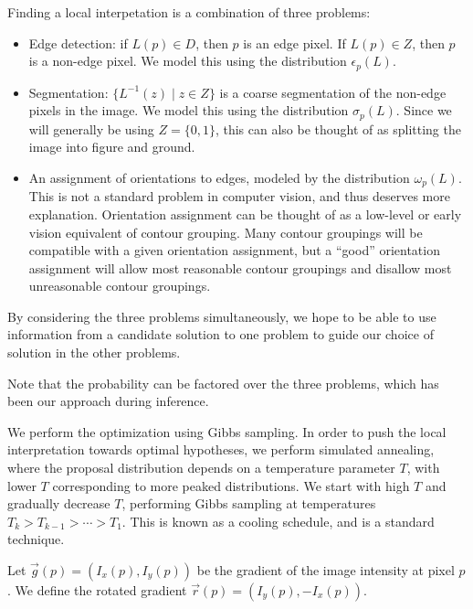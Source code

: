 Finding a local interpetation is a combination of three problems:
\begin{itemize}
\item Edge detection: if $L(p)\in D$, then $p$ is an edge pixel. If
  $L(p)\in Z$, then $p$ is a non-edge pixel. We model this using the
  distribution $\epsilon_p(L)$.

\item Segmentation: $\{ L^{-1}(z)\mid z\in Z\}$ is a coarse
  segmentation of the non-edge pixels in the image. We model this
  using the distribution $\sigma_p(L)$. Since we will generally be
  using $Z=\{0,1\}$, this can also be thought of as splitting the
  image into figure and ground.

\item An assignment of orientations to edges, modeled by the
  distribution $\omega_p(L)$. This is not a standard problem in
  computer vision, and thus deserves more explanation. Orientation
  assignment can be thought of as a low-level or early vision
  equivalent of contour grouping. Many contour groupings will be
  compatible with a given orientation assignment, but a ``good''
  orientation assignment will allow most reasonable contour groupings
  and disallow most unreasonable contour groupings.  

\end{itemize}

By considering the three problems simultaneously, we hope to be able
to use information from a candidate solution to one problem to guide
our choice of solution in the other problems.

Note that the probability can be factored over the three problems,
which has been our approach during inference.

We perform the optimization using Gibbs sampling. In order to push the
local interpretation towards optimal hypotheses, we perform simulated
annealing, where the proposal distribution depends on a temperature
parameter $T$, with lower $T$ corresponding to more peaked
distributions. We start with high $T$ and gradually decrease $T$,
performing Gibbs sampling at temperatures $T_k > T_{k-1} > \cdots >
T_1$. This is known as a cooling schedule, and is a standard
technique.


Let $\vec{g}(p) = (I_x(p), I_y(p))$ be the gradient of the image
intensity at pixel $p$. We define the rotated gradient $\vec{r}(p) =
(I_y(p), -I_x(p))$.


